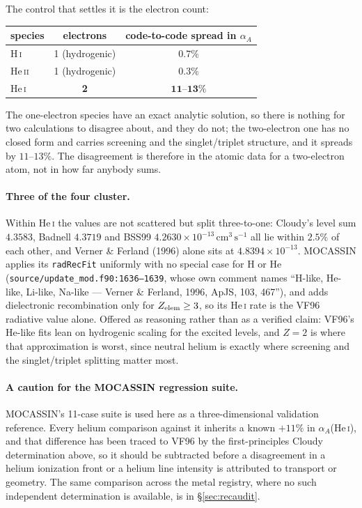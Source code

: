 \documentclass[english,a4paper]{my_memo}
\newcommand{\code}[1]{\texttt{#1}}
\newcommand{\cmc}{\mathrm{cm^{3}\,s^{-1}}}
\begin{document}
The control that settles it is the electron count:
\begin{center}\small
\begin{tabular}{@{}lcc@{}}
\toprule
species & electrons & code-to-code spread in $\alpha_A$ \\
\midrule
H\,\textsc{i}   & 1 (hydrogenic) & $0.7\%$ \\
He\,\textsc{ii} & 1 (hydrogenic) & $0.3\%$ \\
He\,\textsc{i}  & \textbf{2}     & $\mathbf{11}$--$\mathbf{13\%}$ \\
\bottomrule
\end{tabular}
\end{center}
The one-electron species have an exact analytic solution, so there is
nothing for two calculations to disagree about, and they do not; the
two-electron one has no closed form and carries screening and the
singlet/triplet structure, and it spreads by $11$--$13\%$.  The disagreement
is therefore in the atomic data for a two-electron atom, not in how far
anybody sums.

\paragraph{Three of the four cluster.}  Within He\,\textsc{i} the values are
not scattered but split three-to-one: Cloudy's level sum $4.3583$, Badnell
$4.3719$ and BSS99 $4.2630{\times}10^{-13}\,\cmc$ all lie within $2.5\%$ of
each other, and Verner \& Ferland (1996) alone sits at
$4.8394{\times}10^{-13}$.  MOCASSIN applies its \code{radRecFit} uniformly
with no special case for H or He
(\code{source/update\_mod.f90:1636--1639}, whose own comment names
``H-like, He-like, Li-like, Na-like --- Verner \& Ferland, 1996, ApJS, 103,
467''), and adds dielectronic recombination only for
$Z_{\rm elem} \ge 3$, so its He\,\textsc{i} rate is the VF96 radiative
value alone.  Offered as reasoning rather than as a verified claim: VF96's
He-like fits lean on hydrogenic scaling for the excited levels, and $Z = 2$
is where that approximation is worst, since neutral helium is exactly where
screening and the singlet/triplet splitting matter most.

\paragraph{A caution for the MOCASSIN regression suite.}  MOCASSIN's
11-case suite is used here as a three-dimensional validation reference.
Every helium comparison against it inherits a known $+11\%$ in
$\alpha_A$(He\,\textsc{i}), and that difference has been traced to VF96
by the first-principles Cloudy determination above, so it should be
subtracted before a disagreement in a helium ionization front or a helium
line intensity is attributed to transport or geometry.  The same
comparison across the metal registry, where no such independent
determination is available, is in \S\ref{sec:recaudit}.
\end{document}

